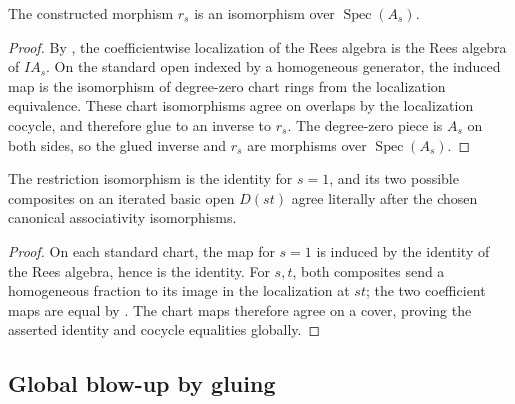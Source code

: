 \begin{proposition}
  \label{prop:nagata-affine-blowup-restrict}

  The constructed morphism $r_s$ is an isomorphism over
  $\operatorname{Spec}(A_s)$.
\end{proposition}

\begin{proof}
  By , the coefficientwise localization
  of the Rees algebra is the Rees algebra of $IA_s$.  On the standard open
  indexed by a homogeneous generator, the induced map is the isomorphism of
  degree-zero chart rings from the localization equivalence.  These chart
  isomorphisms agree on overlaps by the localization cocycle, and therefore
  glue to an inverse to $r_s$.  The degree-zero piece is $A_s$ on both sides,
  so the glued inverse and $r_s$ are morphisms over $\operatorname{Spec}(A_s)$.
\end{proof}

\begin{lemma}
  \label{lemma:nagata-affine-blowup-restrict-cocycle}

  The restriction isomorphism is the identity for $s=1$, and its two possible
  composites on an iterated basic open $D(st)$ agree literally after the
  chosen canonical associativity isomorphisms.
\end{lemma}

\begin{proof}
  On each standard chart, the map for $s=1$ is induced by the identity of the
  Rees algebra, hence is the identity.  For $s,t$, both composites send a
  homogeneous fraction to its image in the localization at $st$; the two
  coefficient maps are equal by
  .
  The chart maps therefore agree on a cover, proving the asserted identity
  and cocycle equalities globally.
\end{proof}

\subsection{Global blow-up by gluing}

